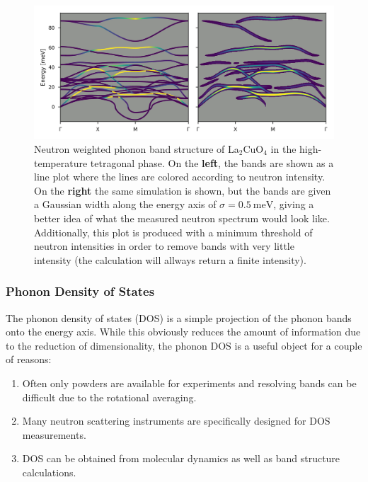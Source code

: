 \begin{figure}
	\centering
	\includegraphics[width=\textwidth]{fig/method/colorbands_example.png}
	\caption[Neutron weighted bands example]{Neutron weighted phonon band structure of La$_2$CuO$_4$ in the high-temperature tetragonal phase. On the \textbf{left}, the bands are shown as a line plot where the lines are colored according to neutron intensity. On the \textbf{right} the same simulation is shown, but the bands are given a Gaussian width along the energy axis of $\sigma = \SI{0.5}{\milli\eV}$, giving a better idea of what the measured neutron spectrum would look like. Additionally, this plot is produced with a minimum threshold of neutron intensities in order to remove bands with very little intensity (the calculation will allways return a finite intensity).}
	\label{fig:bands_sqw_color_line}
\end{figure}

\subsubsection{Phonon Density of States}
The phonon density of states (DOS) is a simple projection of the phonon bands onto the energy axis. While this obviously reduces the amount of information due to the reduction of dimensionality, the phonon DOS is a useful object for a couple of reasons:

\begin{enumerate}
	\item Often only powders are available for experiments and resolving bands can be difficult due to the rotational averaging.
	\item Many neutron scattering instruments are specifically designed for DOS measurements.
	\item DOS can be obtained from molecular dynamics as well as band structure calculations.
\end{enumerate}

